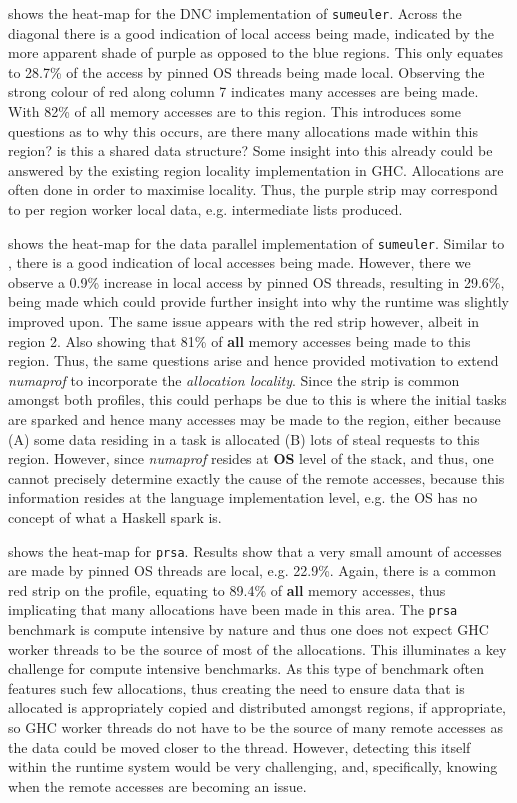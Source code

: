 \documentclass{paper}\usepackage{graphicx}
\begin{document}
 shows the heat-map for the DNC implementation of \lstinline{sumeuler}. Across the diagonal there is a good indication of local access being made, indicated by the more apparent shade of purple as opposed to the blue regions. This only equates to 28.7\% of the access by pinned OS threads being made local. Observing the strong colour of red along column 7 indicates many accesses are being made. With 82\% of all memory accesses are to this region. This introduces some questions as to why this occurs, are there many allocations made within this region? is this a shared data structure? Some insight into this already could be answered by the existing region locality implementation in GHC. Allocations are often done in order to maximise locality. Thus, the purple strip may correspond to per region worker local data, e.g. intermediate lists produced.

 shows the heat-map for the data parallel implementation of \lstinline{sumeuler}. Similar to , there is a good indication of local accesses being made. However, there we observe a 0.9\% increase in local access by pinned OS threads, resulting in 29.6\%, being made which could provide further insight into why the runtime was slightly improved upon. The same issue appears with the red strip however, albeit in region 2. Also showing that 81\% of \textbf{all} memory accesses being made to this region. Thus, the same questions arise and hence provided motivation to extend \textit{numaprof} to incorporate the \textit{allocation locality}. Since the strip is common amongst both profiles, this could perhaps be due to this is where the initial tasks are sparked and hence many accesses may be made to the region, either because (A) some data residing in a task is allocated (B) lots of steal requests to this region. However, since \textit{numaprof} resides at \textbf{OS} level of the stack, and thus, one cannot precisely determine exactly the cause of the remote accesses, because this information resides at the language implementation level, e.g. the OS has no concept of what a Haskell spark is.

 shows the heat-map for \lstinline{prsa}. Results show that a very small amount of accesses are made by pinned OS threads are local, e.g. 22.9\%. Again, there is a common red strip on the profile, equating to 89.4\% of \textbf{all} memory accesses, thus implicating that many allocations have been made in this area. The \lstinline{prsa} benchmark is compute intensive by nature and thus one does not expect GHC worker threads to be the source of most of the allocations. This illuminates a key challenge for compute intensive benchmarks. As this type of benchmark often features such few allocations, thus creating the need to ensure data that is allocated is appropriately copied and distributed amongst regions, if appropriate, so GHC worker threads do not have to be the source of many remote accesses as the data could be moved closer to the thread. However, detecting this itself within the runtime system would be very challenging, and, specifically, knowing when the remote accesses are becoming an issue.
\end{document}
